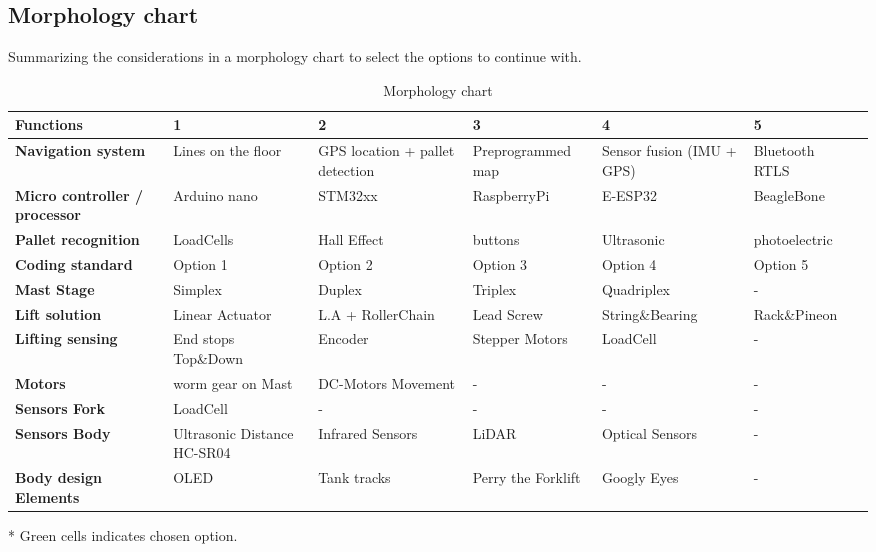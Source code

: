 \documentclass[../report.tex]{subfiles}
\begin{document}
\subsection{Morphology chart}
Summarizing the considerations in a morphology chart to select the options
to continue with.
\begin{table}[H]
    \begin{center}
        \begin{tabularx}{\linewidth}{|L|L|L|L|L|L|L}
            \hline
            \textbf{Functions} & \textbf{1} & \textbf{2}& \textbf{3} & 
            \textbf{4} & \textbf{5} \\
            \hline
            \textbf{Navigation system} & Lines on the floor & GPS location + pallet detection & Preprogrammed map  & Sensor fusion (IMU + GPS) & 
            Bluetooth RTLS \\
            \hline
            \textbf{Micro controller / processor} & Arduino nano & STM32xx & RaspberryPi& E-ESP32 & 
            BeagleBone \\
            \hline
            \textbf{Pallet recognition} & LoadCells & Hall Effect & buttons & Ultrasonic & 
            photoelectric \\
            \hline
            \textbf{Coding standard} & Option 1 & Option 2 & Option 3 & Option 4 & 
            Option 5 \\
            \hline
            \textbf{Mast Stage} & Simplex & Duplex & Triplex & Quadriplex & 
            -\\
            \hline
            \textbf{Lift solution} & Linear Actuator & L.A + RollerChain & Lead Screw& String\&Bearing & Rack\&Pineon \\
            \hline
            \textbf{Lifting sensing} & End stops Top\&Down & Encoder & Stepper Motors & LoadCell & 
            -\\
            \hline
            \textbf{Motors} & worm gear on Mast & DC-Motors Movement & - & - & 
            -\\
            \hline
            \textbf{Sensors Fork} & LoadCell & - & - & - & 
            -\\
            \hline
            \textbf{Sensors Body} & Ultrasonic Distance HC-SR04 & Infrared Sensors & LiDAR & Optical Sensors & 
            -\\
            \hline
            \textbf{Body design Elements} & OLED & Tank tracks &Perry the Forklift & Googly Eyes & 
            - \\
            \hline
        \end{tabularx}
    \end{center}
    \caption{Morphology chart}
\end{table}
* Green cells indicates chosen option.
\end{document}
